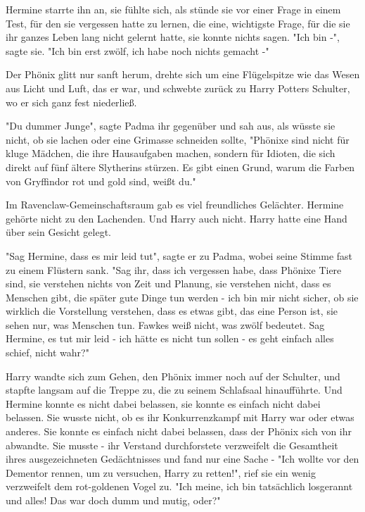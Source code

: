 {Hermine starrte ihn an, sie fühlte sich, als stünde sie vor einer Frage in einem Test, für den sie vergessen hatte zu lernen, die eine, wichtigste Frage, für die sie ihr ganzes Leben lang nicht gelernt hatte, sie konnte nichts sagen. "Ich bin -", sagte sie. "Ich bin erst zwölf, ich habe noch nichts gemacht -"

Der Phönix glitt nur sanft herum, drehte sich um eine Flügelspitze wie das Wesen aus Licht und Luft, das er war, und schwebte zurück zu Harry Potters Schulter, wo er sich ganz fest niederließ.

"Du dummer Junge", sagte Padma ihr gegenüber und sah aus, als wüsste sie nicht, ob sie lachen oder eine Grimasse schneiden sollte, "Phönixe sind nicht für kluge Mädchen, die ihre Hausaufgaben machen, sondern für Idioten, die sich direkt auf fünf ältere Slytherins stürzen. Es gibt einen Grund, warum die Farben von Gryffindor rot und gold sind, weißt du."

Im Ravenclaw-Gemeinschaftsraum gab es viel freundliches Gelächter. Hermine gehörte nicht zu den Lachenden. Und Harry auch nicht. Harry hatte eine Hand über sein Gesicht gelegt.

"Sag Hermine, dass es mir leid tut", sagte er zu Padma, wobei seine Stimme fast zu einem Flüstern sank. "Sag ihr, dass ich vergessen habe, dass Phönixe Tiere sind, sie verstehen nichts von Zeit und Planung, sie verstehen nicht, dass es Menschen gibt, die später gute Dinge tun werden - ich bin mir nicht sicher, ob sie wirklich die Vorstellung verstehen, dass es etwas gibt, das eine Person ist, sie sehen nur, was Menschen tun. Fawkes weiß nicht, was zwölf bedeutet. Sag Hermine, es tut mir leid - ich hätte es nicht tun sollen - es geht einfach alles schief, nicht wahr?"

Harry wandte sich zum Gehen, den Phönix immer noch auf der Schulter, und stapfte langsam auf die Treppe zu, die zu seinem Schlafsaal hinaufführte. Und Hermine konnte es nicht dabei belassen, sie konnte es einfach nicht dabei belassen. Sie wusste nicht, ob es ihr Konkurrenzkampf mit Harry war oder etwas anderes. Sie konnte es einfach nicht dabei belassen, dass der Phönix sich von ihr abwandte. Sie musste - ihr Verstand durchforstete verzweifelt die Gesamtheit ihres ausgezeichneten Gedächtnisses und fand nur eine Sache - "Ich wollte vor den Dementor rennen, um zu versuchen, Harry zu retten!", rief sie ein wenig verzweifelt dem rot-goldenen Vogel zu. "Ich meine, ich bin tatsächlich losgerannt und alles! Das war doch dumm und mutig, oder?"

}
